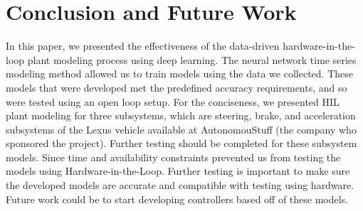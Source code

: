 \documentclass[conference]{IEEEtran}
\begin{document}
\section{Conclusion and Future Work}
\label{sec:conclustionAndFutureWork}

In this paper, we presented the effectiveness of the data-driven hardware-in-the-loop plant modeling process using deep learning. The neural network time series modeling method  allowed us to train models using the data we collected. These models that were developed met the predefined accuracy requirements, and so were tested using an open loop setup. For the conciseness, we  presented HIL plant modeling for three subsystems, which are steering, brake, and acceleration subsystems of the Lexus vehicle available at AutonomouStuff (the company who sponsored the project). Further testing should be completed for these subsystem models. Since time and availability constraints prevented us from testing the models using Hardware-in-the-Loop. Further testing is important to make sure the developed models are accurate and compatible with testing using hardware. Future work  could be to start developing controllers based off of these models.



\end{document}
